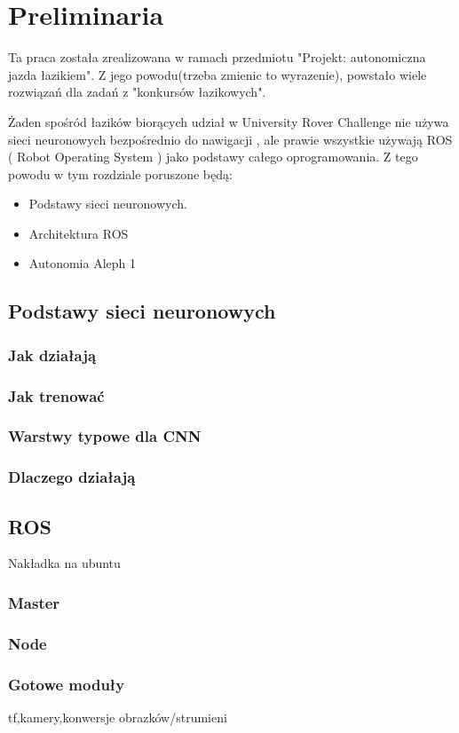 \chapter{Preliminaria}
Ta praca została zrealizowana w ramach przedmiotu "Projekt: autonomiczna jazda łazikiem".
Z jego powodu(trzeba zmienic to wyrazenie), powstało wiele rozwiązań dla zadań z 
"konkursów łazikowych".

Żaden spośród łazików biorących udział w University Rover Challenge nie 
używa sieci neuronowych bezpośrednio do nawigacji , ale prawie wszystkie używają
ROS ( Robot Operating System ) jako podstawy całego oprogramowania. Z tego powodu
w tym rozdziale poruszone będą:
\begin{itemize}
  \item Podstawy sieci neuronowych.
  \item Architektura ROS
  \item Autonomia Aleph 1
\end{itemize}

\section{Podstawy sieci neuronowych}
\subsection{Jak działają}
\subsection{Jak trenować}
\subsection{Warstwy typowe dla CNN}
\subsection{Dlaczego działają}


\section{ROS}
Nakładka na ubuntu
\subsection{Master}
\subsection{Node}
\subsection{Gotowe moduły}
tf,kamery,konwersje obrazków/strumieni


